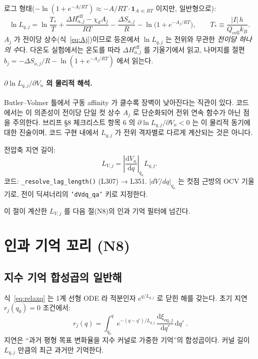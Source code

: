 \documentclass[11pt,a4paper]{article}
\newcommand{\dd}{\mathrm{d}}
\newcommand{\eq}{\mathrm{eq}}
\newcommand{\eff}{\mathrm{eff}}
\newcommand{\cell}{\mathrm{cell}}
\begin{document}
로그 형태($-\ln(1+e^{-A/RT}) \approx -A/RT \cdot\mathbf{1}_{A\ll RT}$ 이지만, 일반형으로):
\begin{equation}
\ln L_{q,j} = \ln\frac{T_*}{T} + \frac{\Delta H_{a,j}^\eff - \chi_d A_j}{RT}
  - \frac{\Delta S_{a,j}}{R} - \ln\!\bigl(1+e^{-A_j/RT}\bigr),\qquad
T_* \equiv \frac{|I|\,h}{Q_\cell k_B}.
\label{eq:lnLq}
\end{equation}
$A_j$ 가 전이당 상수(식~\eqref{eq:Aj})이므로 등온에서 $\ln L_{q,j}$ 는 전위와 무관한
\emph{전이당 하나의 수}다. 다온도 실험에서는 온도를 따라 $\Delta H_{a,j}^\eff$ 를
기울기에서 읽고, 나머지를 절편 $b_j = -\Delta S_{a,j}/R - \ln(1+e^{-A_j/RT})$ 에서 읽는다.

\paragraph{$\partial\ln L_{q,j}/\partial V_n$ 의 물리적 해석.}
Butler--Volmer 틀에서 구동 affinity 가 클수록 장벽이 낮아진다는 직관이 있다. 코드에서는
이 의존성이 전이당 단일 컷 상수 $A_j$ 로 단순화되어 전위 연속 함수가 아닌 점을 주의한다.
브리프 §8 체크리스트 항목 6 의 $\partial\ln L_{q,j}/\partial V_n < 0$ 는 이 물리적 동기에
대한 진술이며, 코드 구현 내에서 $L_{q,j}$ 가 전위 격자별로 다르게 계산되는 것은 아니다.

전압축 지연 길이:
\begin{equation}
L_{V,j} = \left|\frac{\dd V_n}{\dd q}\right|_{q_a}\!\! L_{q,j}.
\label{eq:LV}
\end{equation}
코드: \texttt{\_resolve\_lag\_length()} (L307) → L351. $|dV/dq|_{q_a}$ 는 컷점
근방의 OCV 기울기로, 전이 딕셔너리의 \texttt{'dVdq\_qa'} 키로 지정한다.

이 절이 계산한 $L_{V,j}$ 를 다음 절(N8)의 인과 기억 필터에 넘긴다.

\section{인과 기억 꼬리 (N8)}\label{sec:tail}

\subsection{지수 기억 합성곱의 일반해}

식~\eqref{eq:relaxq} 는 1계 선형 ODE 라 적분인자 $e^{q/L_{q,j}}$ 로 닫힌 해를
갖는다. 초기 지연 $r_j(q_0)=0$ 조건에서:
\begin{equation}
\boxed{\;r_j(q) = \int_{q_0}^q e^{-(q-q')/L_{q,j}}\,\frac{\dd\xi_{\eq,j}}{\dd q'}\,\dd q'\;.}
\label{eq:memory}
\end{equation}
지연은 ``과거 평형 목표 변화율을 지수 커널로 가중한 기억''의 합성곱이다.
커널 길이 $L_{q,j}$ 만큼의 최근 과거만 기억한다.
\end{document}
